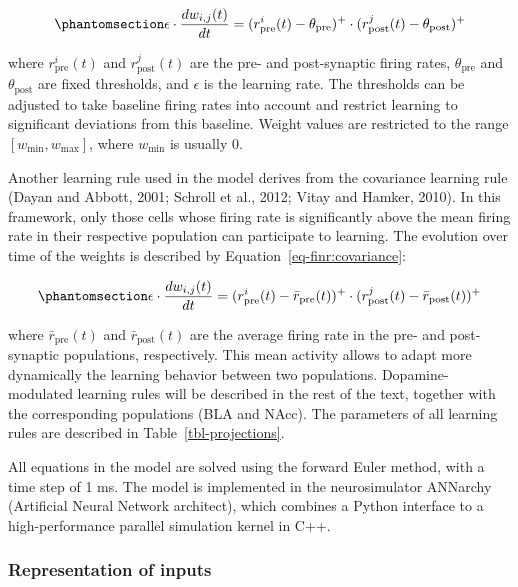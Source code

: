\documentclass[
  11pt,
  a4paper,
]{scrbook}
\begin{document}
\begin{equation}\phantomsection\label{eq-finr:hebbian}{
    \epsilon \cdot \frac{dw_{i, j}(t)}{dt} = (r^i_{\text{pre}}(t) - \theta_{\text{pre}} )^+ \cdot (r^j_{\text{post}}(t) - \theta_{\text{post}} )^+
}\end{equation}

where \(r^i_{\text{pre}}(t)\) and \(r^j_{\text{post}}(t)\) are the pre-
and post-synaptic firing rates, \(\theta_{\text{pre}}\) and
\(\theta_{\text{post}}\) are fixed thresholds, and \(\epsilon\) is the
learning rate. The thresholds can be adjusted to take baseline firing
rates into account and restrict learning to significant deviations from
this baseline. Weight values are restricted to the range
\([w_\text{min}, w_\text{max}]\), where \(w_\text{min}\) is usually 0.

Another learning rule used in the model derives from the covariance
learning rule (Dayan and Abbott, 2001; Schroll et al., 2012; Vitay and
Hamker, 2010). In this framework, only those cells whose firing rate is
significantly above the mean firing rate in their respective population
can participate to learning. The evolution over time of the weights is
described by Equation~\ref{eq-finr:covariance}:

\begin{equation}\phantomsection\label{eq-finr:covariance}{
    \epsilon \cdot \frac{dw_{i, j}(t)}{dt} = (r^i_{\text{pre}}(t) - \bar{r}_{\text{pre}}(t) )^+ \cdot (r^j_{\text{post}}(t) - \bar{r}_{\text{post}}(t))^+
}\end{equation}

where \(\bar{r}_{\text{pre}}(t)\) and \(\bar{r}_{\text{post}}(t)\) are
the average firing rate in the pre- and post-synaptic populations,
respectively. This mean activity allows to adapt more dynamically the
learning behavior between two populations. Dopamine-modulated learning
rules will be described in the rest of the text, together with the
corresponding populations (BLA and NAcc). The parameters of all learning
rules are described in Table~\ref{tbl-projections}.

All equations in the model are solved using the forward Euler method,
with a time step of 1 ms. The model is implemented in the neurosimulator
ANNarchy (Artificial Neural Network architect), which combines a Python
interface to a high-performance parallel simulation kernel in C++.

\subsubsection{Representation of inputs}\label{sec-finr:inputs}
\end{document}
